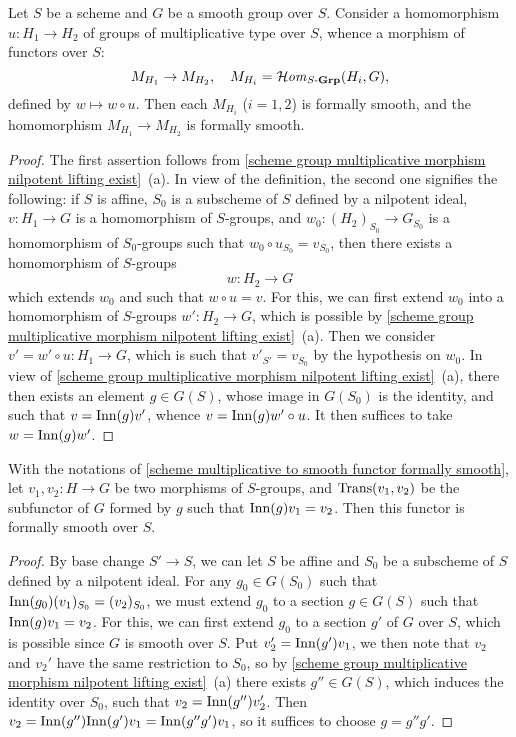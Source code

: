 \begin{proposition}\label{scheme multiplicative to smooth functor formally smooth}
Let $S$ be a scheme and $G$ be a smooth group over $S$. Consider a homomorphism $u:H_1\to H_2$ of groups of multiplicative type over $S$, whence a morphism of functors over $S$:
\[M_{H_1}\to M_{H_2},\quad M_{H_i}=\operatorname{\mathcal{H}\hspace*{-0.4pt}\textit{om}\hspace{0.5pt}}_{S\textup{-}\mathbf{Grp}}(H_i,G),\]
defined by $w\mapsto w\circ u$. Then each $M_{H_i}$ ($i=1,2$) is formally smooth, and the homomorphism $M_{H_1}\to M_{H_2}$ is formally smooth.
\end{proposition}
\begin{proof}
The first assertion follows from \cref{scheme group multiplicative morphism nilpotent lifting exist}~(a). In view of the definition, the second one signifies the following: if $S$ is affine, $S_0$ is a subscheme of $S$ defined by a nilpotent ideal, $v:H_1\to G$ is a homomorphism of $S$-groups, and $w_0:(H_2)_{S_0}\to G_{S_0}$ is a homomorphism of $S_0$-groups such that $w_0\circ u_{S_0}=v_{S_0}$, then there exists a homomorphism of $S$-groups
\[w:H_2\to G\]
which extends $w_0$ and such that $w\circ u=v$. For this, we can first extend $w_0$ into a homomorphism of $S$-groups $w':H_2\to G$, which is possible by \cref{scheme group multiplicative morphism nilpotent lifting exist}~(a). Then we consider $v'=w'\circ u:H_1\to G$, which is such that $v'_{S'}=v_{S_0}$ by the hypothesis on $w_0$. In view of \cref{scheme group multiplicative morphism nilpotent lifting exist}~(a), there then exists an element $g\in G(S)$, whose image in $G(S_0)$ is the identity, and such that $v=\mathrm{Inn}(g)v'$, whence $v=\mathrm{Inn}(g)w'\circ u$. It then suffices to take $w=\mathrm{Inn}(g)w'$.
\end{proof}

\begin{corollary}\label{scheme multiplicative to smooth transporter formally smooth}
With the notations of \cref{scheme multiplicative to smooth functor formally smooth}, let $v_1,v_2:H\to G$ be two morphisms of $S$-groups, and $\mathrm{Trans}(v_1,v_2)$ be the subfunctor of $G$ formed by $g$ such that $\mathrm{Inn}(g)v_1=v_2$. Then this functor is formally smooth over $S$.
\end{corollary}
\begin{proof}
By base change $S'\to S$, we can let $S$ be affine and $S_0$ be a subscheme of $S$ defined by a nilpotent ideal. For any $g_0\in G(S_0)$ such that $\mathrm{Inn}(g_0)(v_1)_{S_0}=(v_2)_{S_0}$, we must extend $g_0$ to a section $g\in G(S)$ such that $\mathrm{Inn}(g)v_1=v_2$. For this, we can first extend $g_0$ to a section $g'$ of $G$ over $S$, which is possible since $G$ is smooth over $S$. Put $v_2'=\mathrm{Inn}(g')v_1$, we then note that $v_2$ and $v_2'$ have the same restriction to $S_0$, so by \cref{scheme group multiplicative morphism nilpotent lifting exist}~(a) there exists $g''\in G(S)$, which induces the identity over $S_0$, such that $v_2=\mathrm{Inn}(g'')v_2'$. Then $v_2=\mathrm{Inn}(g'')\mathrm{Inn}(g')v_1=\mathrm{Inn}(g''g')v_1$, so it suffices to choose $g=g''g'$.
\end{proof}

